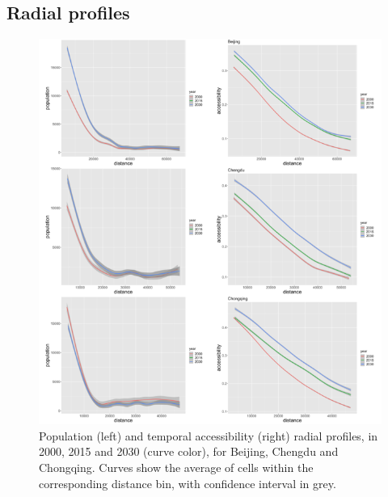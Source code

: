 \documentclass{article}
\begin{document}
\subsection{Radial profiles}



\begin{figure}
	\includegraphics[width=\linewidth]{figures/Fig2a.png}
	\caption{Population (left) and temporal accessibility (right) radial profiles, in 2000, 2015 and 2030 (curve color), for Beijing, Chengdu and Chongqing. Curves show the average of cells within the corresponding distance bin, with confidence interval in grey.\label{fig:fig3}}
\end{figure}
\end{document}
